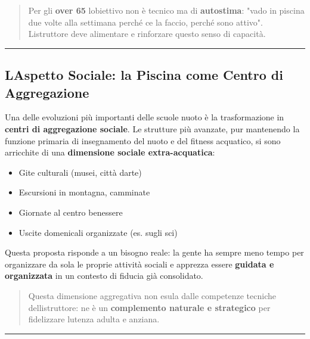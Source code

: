 \documentclass[a4paper,11pt]{article}
\providecommand{\tightlist}{%
  \setlength{\itemsep}{0pt}\setlength{\parskip}{0pt}}
\begin{document}
\begin{quote}
      Per gli \textbf{over 65} l\textquotesingle obiettivo non è tecnico ma di
      \textbf{autostima}: "vado in piscina due volte alla settimana perché ce
      la faccio, perché sono attivo". L\textquotesingle istruttore deve
      alimentare e rinforzare questo senso di capacità.
\end{quote}

\begin{center}\rule{0.5\linewidth}{0.5pt}\end{center}

\subsection{L\textquotesingle Aspetto Sociale: la Piscina come Centro di
      Aggregazione}\label{laspetto-sociale-la-piscina-come-centro-di-aggregazione}

Una delle evoluzioni più importanti delle scuole nuoto è la
trasformazione in \textbf{centri di aggregazione sociale}. Le strutture
più avanzate, pur mantenendo la funzione primaria di insegnamento del
nuoto e del fitness acquatico, si sono arricchite di una
\textbf{dimensione sociale extra-acquatica}:

\begin{itemize}
      \tightlist
      \item
            Gite culturali (musei, città d\textquotesingle arte)
      \item
            Escursioni in montagna, camminate
      \item
            Giornate al centro benessere
      \item
            Uscite domenicali organizzate (es. sugli sci)
\end{itemize}

Questa proposta risponde a un bisogno reale: la gente ha sempre meno
tempo per organizzare da sola le proprie attività sociali e apprezza
essere \textbf{guidata e organizzata} in un contesto di fiducia già
consolidato.

\begin{quote}
      Questa dimensione aggregativa non esula dalle competenze tecniche
      dell\textquotesingle istruttore: ne è un \textbf{complemento naturale e
            strategico} per fidelizzare l\textquotesingle utenza adulta e anziana.
\end{quote}

\begin{center}\rule{0.5\linewidth}{0.5pt}\end{center}
\end{document}
